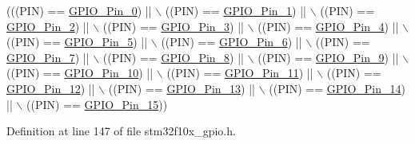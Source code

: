 \begin{DoxyCode}
(((PIN) == \hyperlink{group___g_p_i_o__pins__define_gab305b8d1be9f89bf2b4a05589b456049}{GPIO\_Pin\_0}) || \(\backslash\)
                              ((PIN) == \hyperlink{group___g_p_i_o__pins__define_ga29db642c26f1fa0fffc3ecadcd30f82b}{GPIO\_Pin\_1}) || \(\backslash\)
                              ((PIN) == \hyperlink{group___g_p_i_o__pins__define_gabdf6630324b2f99360537a310687187c}{GPIO\_Pin\_2}) || \(\backslash\)
                              ((PIN) == \hyperlink{group___g_p_i_o__pins__define_ga763c6544859dbe28cd3f8ad820045556}{GPIO\_Pin\_3}) || \(\backslash\)
                              ((PIN) == \hyperlink{group___g_p_i_o__pins__define_gacbf04d09b954606cdcc55eb2e81780e3}{GPIO\_Pin\_4}) || \(\backslash\)
                              ((PIN) == \hyperlink{group___g_p_i_o__pins__define_ga32dbe930f52ce5ab60190c65e9dc741e}{GPIO\_Pin\_5}) || \(\backslash\)
                              ((PIN) == \hyperlink{group___g_p_i_o__pins__define_gaf047899d873f27c2db9f50b342e35a58}{GPIO\_Pin\_6}) || \(\backslash\)
                              ((PIN) == \hyperlink{group___g_p_i_o__pins__define_ga7346b6ce5507bd28a7a79e7dcc816c08}{GPIO\_Pin\_7}) || \(\backslash\)
                              ((PIN) == \hyperlink{group___g_p_i_o__pins__define_gac891f0984dc64af3567577fbf13ab304}{GPIO\_Pin\_8}) || \(\backslash\)
                              ((PIN) == \hyperlink{group___g_p_i_o__pins__define_gaad1891082d5d6bcac06c2729a9fdd2f0}{GPIO\_Pin\_9}) || \(\backslash\)
                              ((PIN) == \hyperlink{group___g_p_i_o__pins__define_ga726af6407ba60ac60f02057227c2d348}{GPIO\_Pin\_10}) || \(\backslash\)
                              ((PIN) == \hyperlink{group___g_p_i_o__pins__define_ga5139d5bc3d15784ae7794ed2ae1ff767}{GPIO\_Pin\_11}) || \(\backslash\)
                              ((PIN) == \hyperlink{group___g_p_i_o__pins__define_gada91257dcaab2c86f75fbd8e4b52b98c}{GPIO\_Pin\_12}) || \(\backslash\)
                              ((PIN) == \hyperlink{group___g_p_i_o__pins__define_ga4155a41c433f3657b9c79cfbd4240966}{GPIO\_Pin\_13}) || \(\backslash\)
                              ((PIN) == \hyperlink{group___g_p_i_o__pins__define_ga21cd1d89c0c061a6f09c5a842610bee5}{GPIO\_Pin\_14}) || \(\backslash\)
                              ((PIN) == \hyperlink{group___g_p_i_o__pins__define_gae686a9fc47cf3e420e5db0784210711d}{GPIO\_Pin\_15}))
\end{DoxyCode}


Definition at line 147 of file stm32f10x\+\_\+gpio.\+h.

